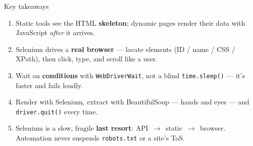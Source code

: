 \documentclass[9pt,aspectratio=169]{beamer}
\begin{document}
\begin{frame}{Key takeaways}
    \begin{enumerate}
        \item Static tools see the HTML \textbf{skeleton}; dynamic pages render their data with JavaScript \textit{after} it arrives.
        \item Selenium drives a \textbf{real browser} --- locate elements (ID / name / CSS / XPath), then click, type, and scroll like a user.
        \item Wait on \textbf{conditions} with \texttt{WebDriverWait}, not a blind \texttt{time.sleep()} --- it's faster and fails loudly.
        \item Render with Selenium, extract with BeautifulSoup --- hands and eyes --- and \texttt{driver.quit()} every time.
        \item Selenium is a slow, fragile \textbf{last resort}: API~$\rightarrow$~static~$\rightarrow$~browser. Automation never suspends \texttt{robots.txt} or a site's ToS.
    \end{enumerate}
    \vspace{1em}
\end{frame}
\end{document}
